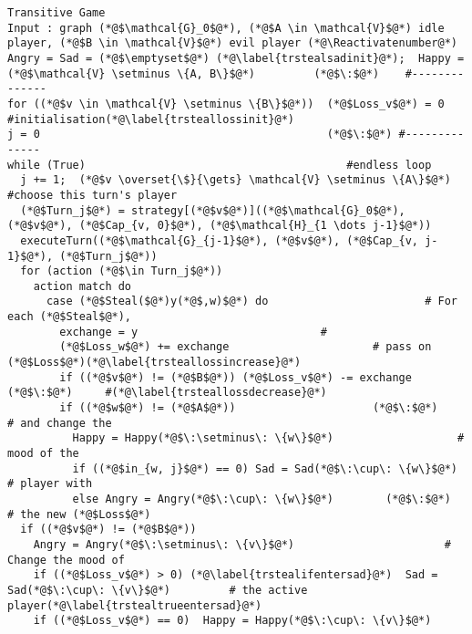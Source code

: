 \Suppressnumber
\begin{lstlisting}[label=transitivegame, style=numbers]
Transitive Game
Input : graph (*@$\mathcal{G}_0$@*), (*@$A \in \mathcal{V}$@*) idle player, (*@$B \in \mathcal{V}$@*) evil player (*@\Reactivatenumber@*)
Angry = Sad = (*@$\emptyset$@*) (*@\label{trstealsadinit}@*);  Happy = (*@$\mathcal{V} \setminus \{A, B\}$@*)         (*@$\:$@*)    #--------------
for ((*@$v \in \mathcal{V} \setminus \{B\}$@*))  (*@$Loss_v$@*) = 0                      #initialisation(*@\label{trsteallossinit}@*)
j = 0                                            (*@$\:$@*) #--------------
while (True)                                        #endless loop
  j += 1;  (*@$v \overset{\$}{\gets} \mathcal{V} \setminus \{A\}$@*)               #choose this turn's player
  (*@$Turn_j$@*) = strategy[(*@$v$@*)]((*@$\mathcal{G}_0$@*), (*@$v$@*), (*@$Cap_{v, 0}$@*), (*@$\mathcal{H}_{1 \dots j-1}$@*))
  executeTurn((*@$\mathcal{G}_{j-1}$@*), (*@$v$@*), (*@$Cap_{v, j-1}$@*), (*@$Turn_j$@*))
  for (action (*@$\in Turn_j$@*))
    action match do
      case (*@$Steal($@*)y(*@$,w)$@*) do                        # For each (*@$Steal$@*),
        exchange = y                            #
        (*@$Loss_w$@*) += exchange                      # pass on (*@$Loss$@*)(*@\label{trsteallossincrease}@*)
        if ((*@$v$@*) != (*@$B$@*)) (*@$Loss_v$@*) -= exchange    (*@$\:$@*)     #(*@\label{trsteallossdecrease}@*)
        if ((*@$w$@*) != (*@$A$@*))                     (*@$\:$@*)      # and change the
          Happy = Happy(*@$\:\setminus\: \{w\}$@*)                   # mood of the
          if ((*@$in_{w, j}$@*) == 0) Sad = Sad(*@$\:\cup\: \{w\}$@*)       # player with
          else Angry = Angry(*@$\:\cup\: \{w\}$@*)        (*@$\:$@*)     # the new (*@$Loss$@*)
  if ((*@$v$@*) != (*@$B$@*))
    Angry = Angry(*@$\:\setminus\: \{v\}$@*)                       # Change the mood of
    if ((*@$Loss_v$@*) > 0) (*@\label{trstealifentersad}@*)  Sad = Sad(*@$\:\cup\: \{v\}$@*)         # the active player(*@\label{trstealtrueentersad}@*)
    if ((*@$Loss_v$@*) == 0)  Happy = Happy(*@$\:\cup\: \{v\}$@*)
\end{lstlisting}
